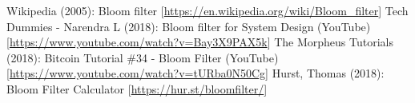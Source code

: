\documentclass[a4paper, 11pt]{article}
\begin{document}
\begin{thebibliography}{9}
Wikipedia (2005): Bloom filter [\url{https://en.wikipedia.org/wiki/Bloom\_filter}]
Tech Dummies - Narendra L (2018): Bloom filter for System Design (YouTube) [\url{https://www.youtube.com/watch?v=Bay3X9PAX5k}]
The Morpheus Tutorials (2018): Bitcoin Tutorial \#34 - Bloom Filter (YouTube) [\url{https://www.youtube.com/watch?v=tURba0N50Cg}]
 Hurst, Thomas (2018): Bloom Filter Calculator [\url{https://hur.st/bloomfilter/}]
\end{thebibliography}
\end{document}
